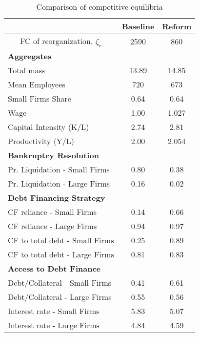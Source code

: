 \documentclass[12pt]{article}
\begin{document}
\begin{table}[h!]
    \centering
    \begin{tabular}{lcc}
    & \textbf{Baseline} & \textbf{Reform} \\    
    \toprule
    \multicolumn{1}{c}{FC of reorganization, $\zeta_{r}$} & 2590 & 860  \vspace{3mm} \\  
    \multicolumn{3}{l}{\textbf{Aggregates}} \\ \hline
    Total mass & 13.89 & 14.85  \\
    Mean Employees & 720 & 673  \\
    Small Firms Share  & 0.64 & 0.64  \\
    Wage & 1.00 & 1.027  \\
    Capital Intensity (K/L) & 2.74 & 2.81  \\
    Productivity (Y/L) & 2.00 & 2.054  \vspace{3mm} \\  
    \multicolumn{3}{l}{\textbf{Bankruptcy Resolution}} \\ \hline
    Pr. Liquidation - Small Firms & 0.80 & 0.38  \\
    Pr. Liquidation - Large Firms & 0.16 & 0.02  \vspace{3mm} \\  
    \multicolumn{3}{l}{\textbf{Debt Financing Strategy}} \\ \hline
    CF reliance - Small Firms & 0.14 & 0.66  \\
    CF reliance - Large Firms & 0.94 & 0.97  \vspace{1mm} \\  
    CF to total debt - Small Firms & 0.25 & 0.89  \\
    CF to total debt - Large Firms & 0.81 & 0.83  \vspace{3mm} \\  
    \multicolumn{3}{l}{\textbf{Access to Debt Finance}} \\ \hline
    Debt/Collateral - Small Firms & 0.41 & 0.61  \\
    Debt/Collateral - Large Firms & 0.55 & 0.56  \vspace{1mm} \\  
    Interest rate - Small Firms & 5.83 & 5.07  \\
    Interest rate - Large Firms & 4.84 & 4.59  \\  \bottomrule
    \end{tabular}
    \caption{Comparison of competitive equilibria}
    \label{tab:SSvalues}
\end{table}
\end{document}
